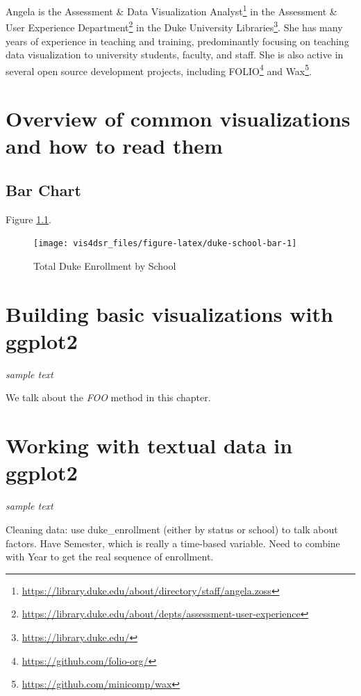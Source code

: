\documentclass[
]{krantz}
\renewcommand{\href}[2]{#2\footnote{\url{#1}}}
\begin{document}
Angela is the \href{https://library.duke.edu/about/directory/staff/angela.zoss}{Assessment \& Data Visualization Analyst} in the \href{https://library.duke.edu/about/depts/assessment-user-experience}{Assessment \& User Experience Department} in the \href{https://library.duke.edu/}{Duke University Libraries}. She has many years of experience in teaching and training, predominantly focusing on teaching data visualization to university students, faculty, and staff. She is also active in several open source development projects, including \href{https://github.com/folio-org/}{FOLIO} and \href{https://github.com/minicomp/wax}{Wax}.

\mainmatter

\hypertarget{reading-visualizations}{%
\chapter{Overview of common visualizations and how to read them}\label{reading-visualizations}}

\hypertarget{bar-chart}{%
\section{Bar Chart}\label{bar-chart}}

Figure \ref{fig:duke-school-bar}.

\begin{figure}
\texttt{[image: vis4dsr\_files/figure-latex/duke-school-bar-1]} \caption{Total Duke Enrollment by School}\label{fig:duke-school-bar}
\end{figure}

\hypertarget{building-basic-visualizations}{%
\chapter{Building basic visualizations with ggplot2}\label{building-basic-visualizations}}

\emph{sample text}

We talk about the \emph{FOO} method in this chapter.

\hypertarget{text-data-visualizations}{%
\chapter{Working with textual data in ggplot2}\label{text-data-visualizations}}

\emph{sample text}

Cleaning data: use duke\_enrollment (either by status or school) to talk about factors.
Have Semester, which is really a time-based variable. Need to combine with Year
to get the real sequence of enrollment.
\end{document}

